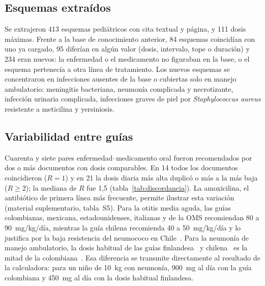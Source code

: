 \documentclass[11pt,a4paper]{article}
\begin{document}
\subsection{Esquemas extraídos}

Se extrajeron 413 esquemas pediátricos con cita textual y página, y 111 dosis máximas. Frente a la base de conocimiento anterior, 84 esquemas coincidían con uno ya cargado, 95 diferían en algún valor (dosis, intervalo, tope o duración) y 234 eran nuevos: la enfermedad o el medicamento no figuraban en la base, o el esquema pertenecía a otra línea de tratamiento. Los nuevos esquemas se concentraron en infecciones ausentes de la base o cubiertas solo en manejo ambulatorio: meningitis bacteriana, neumonía complicada y necrotizante, infección urinaria complicada, infecciones graves de piel por \emph{Staphylococcus aureus} resistente a meticilina y yersiniosis.

\subsection{Variabilidad entre guías}

Cuarenta y siete pares enfermedad--medicamento oral fueron recomendados por dos o más documentos con dosis comparables. En 14 todos los documentos coincidieron ($R = 1$) y en 21 la dosis diaria más alta duplicó o más a la más baja ($R \ge 2$); la mediana de $R$ fue 1,5 (tabla~\ref{tab:discordancia}). La amoxicilina, el antibiótico de primera línea más frecuente, permite ilustrar esta variación (material suplementario, tabla~S5). Para la otitis media aguda, las guías colombianas, mexicana, estadounidenses, italianas y de la OMS recomiendan 80 a 90~mg/kg/día, mientras la guía chilena recomienda 40 a 50~mg/kg/día y lo justifica por la baja resistencia del neumococo en Chile~\citep{chileoma2019}. Para la neumonía de manejo ambulatorio, la dosis habitual de las guías finlandesa~\citep{backman2025} y chilena~\citep{chilenac2019} es la mitad de la colombiana~\citep{gpc42,aiepi2012}. Esa diferencia se transmite directamente al resultado de la calculadora: para un niño de 10~kg con neumonía, 900~mg al día con la guía colombiana y 450~mg al día con la dosis habitual finlandesa.
\end{document}
